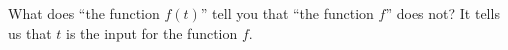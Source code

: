 {What does ``the function $f(t)$'' tell you that ``the function $f$'' does not?}
{It tells us that $t$ is the input for the function $f$.}
